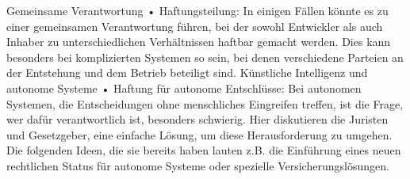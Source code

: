 \documentclass{report}
\begin{document}
Gemeinsame Verantwortung
•	Haftungsteilung: In einigen Fällen könnte es zu einer gemeinsamen Verantwortung führen, bei der sowohl Entwickler als auch Inhaber zu unterschiedlichen Verhältnissen haftbar gemacht werden. Dies kann besonders bei komplizierten Systemen so sein, bei denen verschiedene Parteien an der Entstehung und dem Betrieb beteiligt sind.
Künstliche Intelligenz und autonome Systeme
•	Haftung für autonome Entschlüsse: Bei autonomen Systemen, die Entscheidungen ohne menschliches Eingreifen treffen, ist die Frage, wer dafür verantwortlich ist, besonders schwierig. Hier diskutieren die Juristen und Gesetzgeber, eine einfache Lösung, um diese Herausforderung zu umgehen. Die folgenden Ideen, die sie bereits haben lauten z.B. die Einführung eines neuen rechtlichen Status für autonome Systeme oder spezielle Versicherungslösungen.


 



\printbibliography
\end{document}
